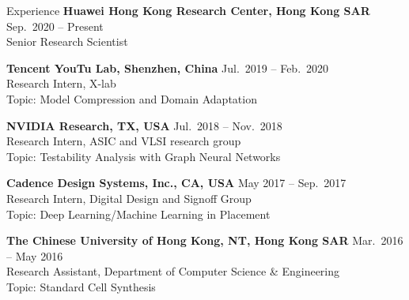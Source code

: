 
\begin{rSection}{Experience}
{\bf Huawei Hong Kong Research Center, Hong Kong SAR}         \hfill { Sep.~2020 -- Present} \\
Senior Research Scientist

{\bf Tencent YouTu Lab, Shenzhen, China}         \hfill { Jul.~2019 -- Feb.~2020} \\
Research Intern, X-lab\\
Topic: Model Compression and Domain Adaptation

{\bf NVIDIA Research, TX, USA}               \hfill { Jul.~2018 -- Nov.~2018} \\
Research Intern, ASIC and VLSI research group\\
Topic: Testability Analysis with Graph Neural Networks

{\bf Cadence Design Systems, Inc., CA, USA}               \hfill { May 2017 -- Sep.~2017} \\
Research Intern, Digital Design and Signoff Group\\
Topic: Deep Learning/Machine Learning in Placement

{\bf The Chinese University of Hong Kong, NT, Hong Kong SAR}  \hfill { Mar.~2016 -- May 2016} \\
Research Assistant, Department of Computer Science \& Engineering \\
Topic: Standard Cell Synthesis

\end{rSection}



